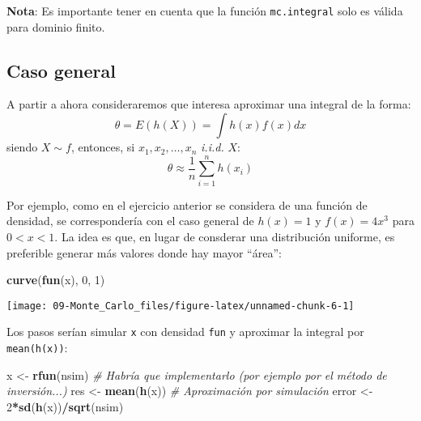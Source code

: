 \documentclass[
]{book}
\newenvironment{Shaded}{\begin{snugshade}}{\end{snugshade}}
\newcommand{\CommentTok}[1]{\textcolor[rgb]{0.56,0.35,0.01}{\textit{#1}}}
\newcommand{\DecValTok}[1]{\textcolor[rgb]{0.00,0.00,0.81}{#1}}
\newcommand{\KeywordTok}[1]{\textcolor[rgb]{0.13,0.29,0.53}{\textbf{#1}}}
\newcommand{\NormalTok}[1]{#1}
\newcommand{\OperatorTok}[1]{\textcolor[rgb]{0.81,0.36,0.00}{\textbf{#1}}}
\newcommand{\StringTok}[1]{\textcolor[rgb]{0.31,0.60,0.02}{#1}}
\theoremstyle{break}
\theoremstyle{definition}
\theoremstyle{definition}
\theoremstyle{definition}
\theoremstyle{remark}
\begin{document}
\textbf{Nota}: Es importante tener en cuenta que la función \texttt{mc.integral} solo es válida para dominio finito.

\hypertarget{caso-general}{%
\subsection{Caso general}\label{caso-general}}

A partir a ahora consideraremos que interesa aproximar una integral de la forma:
\[\theta = E\left( h\left( X\right) \right) = \int h\left( x\right) f(x)dx\]siendo
\(X\sim f\), entonces, si \(x_{1},x_{2},\ldots ,x_{n}\) \emph{i.i.d.}
\(X\):
\[\theta \approx \frac{1}{n}\sum\limits_{i=1}^{n}h\left( x_{i}\right)\]

Por ejemplo, como en el ejercicio anterior se considera de una función de densidad,
se correspondería con el caso general de \(h(x) = 1\) y \(f(x) = 4x^3\) para \(0<x<1\).
La idea es que, en lugar de consderar una distribución uniforme,
es preferible generar más valores donde hay mayor ``área'':

\begin{Shaded}
\begin{Highlighting}[]
\KeywordTok{curve}\NormalTok{(}\KeywordTok{fun}\NormalTok{(x), }\DecValTok{0}\NormalTok{, }\DecValTok{1}\NormalTok{)}
\end{Highlighting}
\end{Shaded}

\begin{center}\texttt{[image: 09-Monte\_Carlo\_files/figure-latex/unnamed-chunk-6-1]} \end{center}

Los pasos serían simular \texttt{x} con densidad \texttt{fun} y aproximar la integral por \texttt{mean(h(x))}:

\begin{Shaded}
\begin{Highlighting}[]
\NormalTok{x <-}\StringTok{ }\KeywordTok{rfun}\NormalTok{(nsim) }\CommentTok{# Habría que implementarlo (por ejemplo por el método de inversión...)}
\NormalTok{res <-}\StringTok{ }\KeywordTok{mean}\NormalTok{(}\KeywordTok{h}\NormalTok{(x)) }\CommentTok{# Aproximación por simulación }
\NormalTok{error <-}\StringTok{ }\DecValTok{2}\OperatorTok{*}\KeywordTok{sd}\NormalTok{(}\KeywordTok{h}\NormalTok{(x))}\OperatorTok{/}\KeywordTok{sqrt}\NormalTok{(nsim)}
\end{Highlighting}
\end{Shaded}
\end{document}
